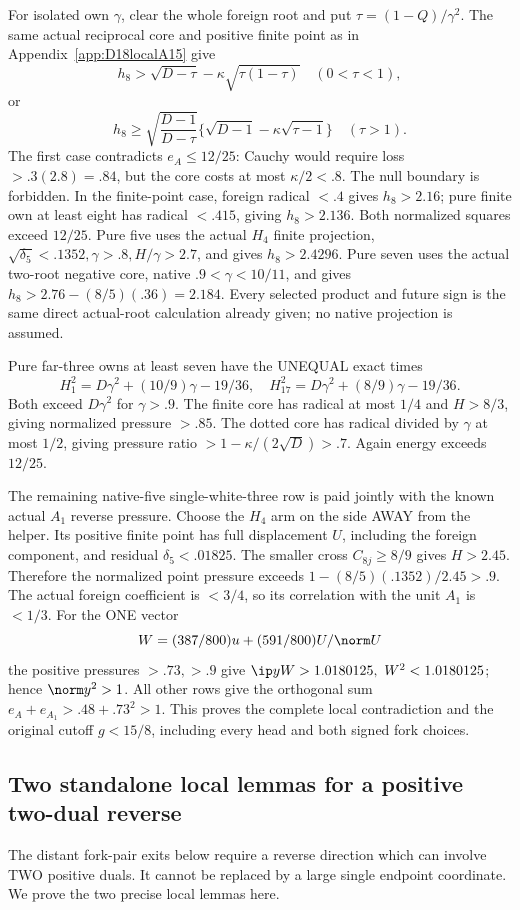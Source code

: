 For isolated own \(\gamma\), clear the whole foreign root and put
\(\tau=(1-Q)/\gamma^2\).
The same actual reciprocal core and positive finite point as in
Appendix~\ref{app:D18localA15} give
\[
 h_8>\sqrt{D-\tau}-\kappa\sqrt{\tau(1-\tau)}
 \quad(0<\tau<1),
\]
or
\[
 h_8\geq\sqrt{\frac{D-1}{D-\tau}}
 \{\sqrt{D-1}-\kappa\sqrt{\tau-1}\}\quad(\tau>1).
\]
The first case contradicts \(e_A\leq12/25\):
Cauchy would require loss \(>.3(2.8)=.84\), but the core costs
at most \(\kappa/2<.8\).
The null boundary is forbidden.
In the finite-point case, foreign radical \(<.4\) gives
\(h_8>2.16\); pure finite own at least eight has radical \(<.415\),
giving \(h_8>2.136\). Both normalized squares exceed \(12/25\).
Pure five uses the actual \(H_4\) finite projection,
\(\sqrt{\delta_5}<.1352,\gamma>.8,H/\gamma>2.7\),
and gives \(h_8>2.4296\).
Pure seven uses the actual two-root negative core, native
\(.9<\gamma<10/11\), and gives
\(h_8>2.76-(8/5)(.36)=2.184\).
Every selected product and future sign is the same direct actual-root
calculation already given; no native projection is assumed.

Pure far-three owns at least seven have the UNEQUAL exact times
\[
 H_1^2=D\gamma^2+(10/9)\gamma-19/36,\quad
 H_{17}^2=D\gamma^2+(8/9)\gamma-19/36 .
\]
Both exceed \(D\gamma^2\) for \(\gamma>.9\).
The finite core has radical at most \(1/4\) and \(H>8/3\),
giving normalized pressure \(>.85\).
The dotted core has radical divided by \(\gamma\) at most \(1/2\),
giving pressure ratio \(>1-\kappa/(2\sqrt D)>.7\).
Again energy exceeds \(12/25\).

The remaining native-five single-white-three row is paid jointly
with the known actual \(A_1\) reverse pressure.
Choose the \(H_4\) arm on the side AWAY from the helper.
Its positive finite point has full displacement \(U\), including
the foreign component, and residual \(\delta_5<.01825\).
The smaller cross \(C_{8j}\geq8/9\) gives \(H>2.45\).
Therefore the normalized point pressure exceeds
\(1-(8/5)(.1352)/2.45>.9\).
The actual foreign coefficient is \(<3/4\), so its correlation
with the unit \(A_1\) is \(<1/3\).
For the ONE vector
\[
 W=(387/800)u+(591/800)U/\norm U
\]
the positive pressures \(>.73,>.9\) give
\(\ip yW>1.0180125,\ W^2<1.0180125\);
hence \(\norm y^2>1\).
All other rows give the orthogonal sum
\(e_A+e_{A_1}>.48+.73^2>1\).
This proves the complete local contradiction and the original cutoff
\(g<15/8\), including every head and both signed fork choices.

\subsection{Two standalone local lemmas for a positive two-dual reverse}
\label{app:D18twodual}
The distant fork-pair exits below require a reverse direction which
can involve TWO positive duals. It cannot be replaced by a large
single endpoint coordinate.
We prove the two precise local lemmas here.

